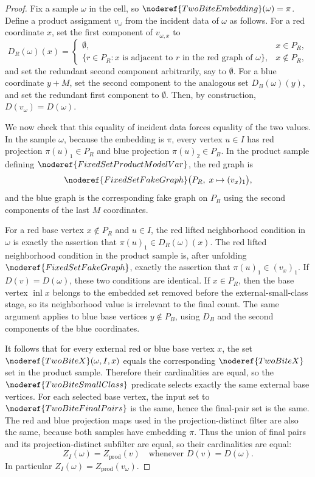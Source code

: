 \begin{proof}
Fix a sample \(\omega\) in the cell, so
\(\noderef{TwoBiteEmbedding}(\omega)=\pi\).  Define a product assignment
\(v_\omega\) from the incident data of \(\omega\) as follows.  For a red
coordinate \(x\), set the first component of \(v_{\omega,x}\) to
\[
D_R(\omega)(x)=
\begin{cases}
\emptyset, & x\in P_R,\\
\{r\in P_R:\text{\(x\) is adjacent to \(r\) in the red graph of \(\omega\)}\},
  & x\notin P_R,
\end{cases}
\]
and set the redundant second component arbitrarily, say to \(\emptyset\).
For a blue coordinate \(y+M\), set the second component to the analogous set
\(D_B(\omega)(y)\), and set the redundant first component to \(\emptyset\).
Then, by construction, \(D(v_\omega)=D(\omega)\).

We now check that this equality of incident data forces equality of the two
values.  In the sample \(\omega\), because the embedding is \(\pi\), every
vertex \(u\in I\) has red projection \(\pi(u)_1\in P_R\) and blue projection
\(\pi(u)_2\in P_B\).  In the product sample defining
\(\noderef{FixedSetProductModelVar}\), the red graph is
\[
\noderef{FixedSetFakeGraph}
  \bigl(P_R,\;x\mapsto (v_x)_1\bigr),
\]
and the blue graph is the corresponding fake graph on \(P_B\) using the
second components of the last \(M\) coordinates.

For a red base vertex \(x\notin P_R\) and \(u\in I\), the red lifted
neighborhood condition in \(\omega\) is exactly the assertion that
\(\pi(u)_1\in D_R(\omega)(x)\).  The red lifted neighborhood condition in the
product sample is, after unfolding \(\noderef{FixedSetFakeGraph}\), exactly
the assertion that \(\pi(u)_1\in (v_x)_1\).  If \(D(v)=D(\omega)\), these two
conditions are identical.  If \(x\in P_R\), then the base vertex
\(\operatorname{inl}x\) belongs to the embedded set removed before the
external-small-class stage, so its neighborhood value is irrelevant to the
final count.  The same argument applies to blue base vertices \(y\notin P_B\),
using \(D_B\) and the second components of the blue coordinates.

It follows that for every external red or blue base vertex \(x\), the set
\(\noderef{TwoBiteX}(\omega,I,x)\) equals the corresponding
\(\noderef{TwoBiteX}\) set in the product sample.  Therefore their
cardinalities are equal, so the \(\noderef{TwoBiteSmallClass}\) predicate
selects exactly the same external base vertices.  For each selected base
vertex, the input set to \(\noderef{TwoBiteFinalPairs}\) is the same, hence
the final-pair set is the same.  The red and blue projection maps used in the
projection-distinct filter are also the same, because both samples have
embedding \(\pi\).  Thus the union of final pairs and its
projection-distinct subfilter are equal, so their cardinalities are equal:
\[
Z_I(\omega)=Z_{\mathrm{prod}}(v)
\quad\text{whenever }D(v)=D(\omega).
\]
In particular \(Z_I(\omega)=Z_{\mathrm{prod}}(v_\omega)\).


\end{proof}
